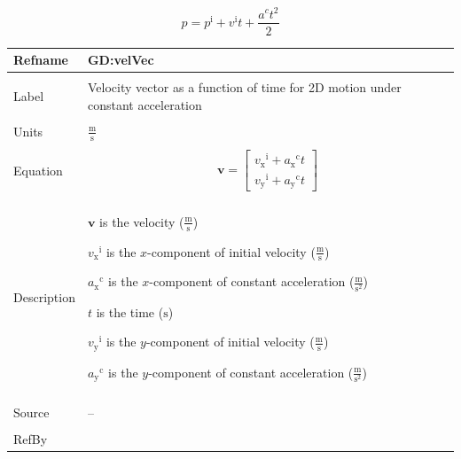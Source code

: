 \documentclass[12pt]{article}
\begin{document}
\begin{displaymath}
p={p^{\text{i}}}+{v^{\text{i}}} t+\frac{{a^{c}} t^{2}}{2}
\end{displaymath}
\vspace{\baselineskip}
\noindent
\begin{minipage}{\textwidth}
\begin{tabular}{>{\raggedright}p{}>{\raggedright\arraybackslash}p{}}
\toprule \textbf{Refname} & \textbf{GD:velVec}
\label{GD:velVec}
\\ \midrule \\
Label & Velocity vector as a function of time for 2D motion under constant acceleration
        
\\ \midrule \\
Units & $\frac{\text{m}}{\text{s}}$
        
\\ \midrule \\
Equation & \begin{displaymath}
           \symbf{v}=\begin{bmatrix}
                     {{v_{\text{x}}}^{\text{i}}}+{{a_{\text{x}}}^{\text{c}}} t\\
                     {{v_{\text{y}}}^{\text{i}}}+{{a_{\text{y}}}^{\text{c}}} t
                     \end{bmatrix}
           \end{displaymath}
\\ \midrule \\
Description & \begin{symbDescription}
              \item{$\symbf{v}$ is the velocity ($\frac{\text{m}}{\text{s}}$)}
              \item{${{v_{\text{x}}}^{\text{i}}}$ is the $x$-component of initial velocity ($\frac{\text{m}}{\text{s}}$)}
              \item{${{a_{\text{x}}}^{\text{c}}}$ is the $x$-component of constant acceleration ($\frac{\text{m}}{\text{s}^{2}}$)}
              \item{$t$ is the time (${\text{s}}$)}
              \item{${{v_{\text{y}}}^{\text{i}}}$ is the $y$-component of initial velocity ($\frac{\text{m}}{\text{s}}$)}
              \item{${{a_{\text{y}}}^{\text{c}}}$ is the $y$-component of constant acceleration ($\frac{\text{m}}{\text{s}^{2}}$)}
              \end{symbDescription}
\\ \midrule \\
Source & --
         
\\ \midrule \\
RefBy & 
\\ \bottomrule
\end{tabular}
\end{minipage}
\end{document}
